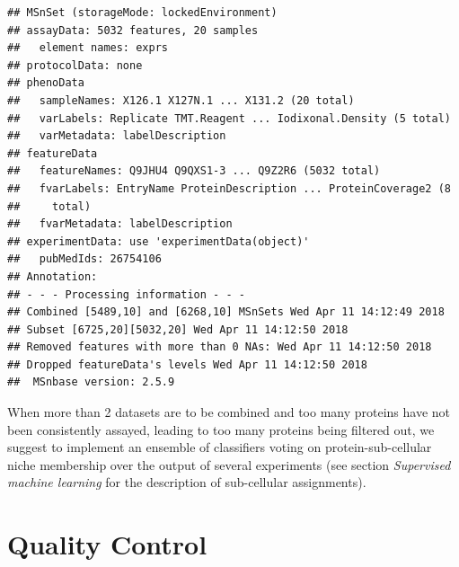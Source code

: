 \begin{knitrout}
\color{fgcolor}\begin{kframe}
\begin{alltt}
 \hlkwb{<-} 
\end{alltt}
\begin{verbatim}
## MSnSet (storageMode: lockedEnvironment)
## assayData: 5032 features, 20 samples 
##   element names: exprs 
## protocolData: none
## phenoData
##   sampleNames: X126.1 X127N.1 ... X131.2 (20 total)
##   varLabels: Replicate TMT.Reagent ... Iodixonal.Density (5 total)
##   varMetadata: labelDescription
## featureData
##   featureNames: Q9JHU4 Q9QXS1-3 ... Q9Z2R6 (5032 total)
##   fvarLabels: EntryName ProteinDescription ... ProteinCoverage2 (8
##     total)
##   fvarMetadata: labelDescription
## experimentData: use 'experimentData(object)'
##   pubMedIds: 26754106 
## Annotation:  
## - - - Processing information - - -
## Combined [5489,10] and [6268,10] MSnSets Wed Apr 11 14:12:49 2018 
## Subset [6725,20][5032,20] Wed Apr 11 14:12:50 2018 
## Removed features with more than 0 NAs: Wed Apr 11 14:12:50 2018 
## Dropped featureData's levels Wed Apr 11 14:12:50 2018 
##  MSnbase version: 2.5.9
\end{verbatim}
\end{kframe}
\end{knitrout}

When more than 2 datasets are to be combined and too many proteins
have not been consistently assayed, leading to too many proteins being
filtered out, we suggest to implement an ensemble of classifiers
voting on protein-sub-cellular niche membership over the output of
several experiments (see section \textit{Supervised machine learning}
for the description of sub-cellular assignments).

\section*{Quality Control}

